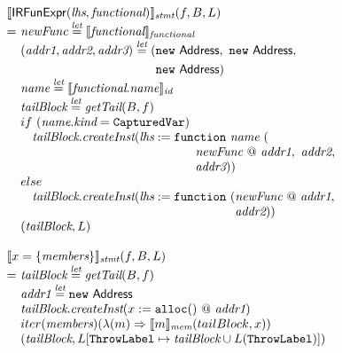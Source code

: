 \[\begin{array}{l@{}l@{~}l}
\lefteqn{\transfun{\SF{IRFunExpr}(\emph{lhs}, \emph{functional})}_{\emph{stmt}}(f, B, L)}\\
& = & \emph{newFunc} \letval \transfun{\emph{functional}}_{\emph{functional}}\\
& & (\emph{addr1}, \emph{addr2}, \emph{addr3}) \letval (\new\ \Address,\ \new\ \Address,\\
& & \phantom{(\emph{addr1}, \emph{addr2}, \emph{addr3}) \letval (}\new\ \Address)\\
& & \emph{name} \letval \transfun{\emph{functional}.\emph{name}}_{\emph{id}}\\
& & \emph{tailBlock} \letval \getTail(B, f)\\
& & if\ (\emph{name}.\emph{kind} = \TT{CapturedVar}) \\
& & \phantom{if} \emph{tailBlock}.\emph{createInst}(\emph{lhs} := \TT{function}\ \emph{name}\ (\\
& & \phantom{if \emph{tailBlock}.\emph{createInst}(\emph{lhs} := \qquad}
\emph{newFunc} ~@~ \emph{addr1},\ \emph{addr2},\\
& & \phantom{if \emph{tailBlock}.\emph{createInst}(\emph{lhs} := \qquad}
 \emph{addr3}))\\
& & else\\
& & \phantom{if} \emph{tailBlock}.\emph{createInst}(\emph{lhs} := \TT{function}\ (\emph{newFunc} ~@~ \emph{addr1},\\
& & \phantom{if \emph{tailBlock}.\emph{createInst}(\emph{lhs} := \TT{function}\ (}\emph{addr2}))\\
& & (\emph{tailBlock}, L)\\
& & \\

\lefteqn{\transfun{\irobject{x}{\emph{members}}}_{\emph{stmt}}(f, B, L)}\\
& = & \emph{tailBlock} \letval \getTail(B, f)\\
& & \emph{addr1} \letval \new\ \Address\\
& & \emph{tailBlock}.\emph{createInst}(x := \TT{alloc}() ~@~ \emph{addr1})\\
& & iter(\emph{members})(\lambda(m) \Rightarrow \transfun{m}_{\emph{mem}}(tailBlock, x))\\
& & (\emph{tailBlock}, L[\ThrowLabel \mapsto \emph{tailBlock} \cup L(\ThrowLabel)])\\
& & \\


\end{array}\]
